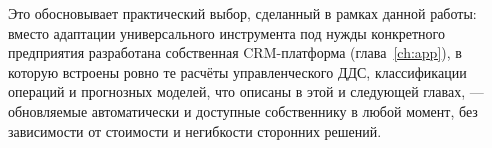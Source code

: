 Это обосновывает практический выбор, сделанный в рамках данной работы: вместо адаптации универсального инструмента под нужды конкретного предприятия разработана собственная CRM-платформа (глава~\ref{ch:app}), в которую встроены ровно те расчёты управленческого ДДС, классификации операций и прогнозных моделей, что описаны в этой и следующей главах, --- обновляемые автоматически и доступные собственнику в любой момент, без зависимости от стоимости и негибкости сторонних решений.
